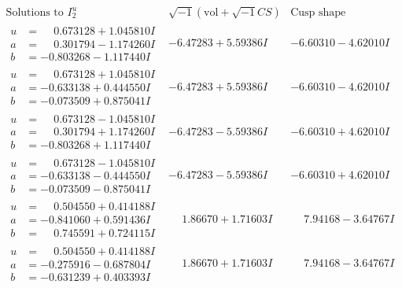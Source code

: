 \documentclass[1p]{elsarticle_modified}
\theoremstyle{definition}
\newcommand{\I}{\sqrt{-1}}
\begin{document}
$$\begin{array}{c|c|c}  
\text{Solutions to }I^u_{2}& \I (\text{vol} + \sqrt{-1}CS) & \text{Cusp shape}\\
 \hline 
\begin{aligned}
u &= \phantom{-}0.673128 + 1.045810 I \\
a &= \phantom{-}0.301794 - 1.174260 I \\
b &= -0.803268 - 1.117440 I\end{aligned}
 & -6.47283 + 5.59386 I & -6.60310 - 4.62010 I \\ \hline\begin{aligned}
u &= \phantom{-}0.673128 + 1.045810 I \\
a &= -0.633138 + 0.444550 I \\
b &= -0.073509 + 0.875041 I\end{aligned}
 & -6.47283 + 5.59386 I & -6.60310 - 4.62010 I \\ \hline\begin{aligned}
u &= \phantom{-}0.673128 - 1.045810 I \\
a &= \phantom{-}0.301794 + 1.174260 I \\
b &= -0.803268 + 1.117440 I\end{aligned}
 & -6.47283 - 5.59386 I & -6.60310 + 4.62010 I \\ \hline\begin{aligned}
u &= \phantom{-}0.673128 - 1.045810 I \\
a &= -0.633138 - 0.444550 I \\
b &= -0.073509 - 0.875041 I\end{aligned}
 & -6.47283 - 5.59386 I & -6.60310 + 4.62010 I \\ \hline\begin{aligned}
u &= \phantom{-}0.504550 + 0.414188 I \\
a &= -0.841060 + 0.591436 I \\
b &= \phantom{-}0.745591 + 0.724115 I\end{aligned}
 & \phantom{-}1.86670 + 1.71603 I & \phantom{-}7.94168 - 3.64767 I \\ \hline\begin{aligned}
u &= \phantom{-}0.504550 + 0.414188 I \\
a &= -0.275916 - 0.687804 I \\
b &= -0.631239 + 0.403393 I\end{aligned}
 & \phantom{-}1.86670 + 1.71603 I & \phantom{-}7.94168 - 3.64767 I \\ \hline\begin{aligned}

\end{aligned}
\end{array}$$
\end{document}
